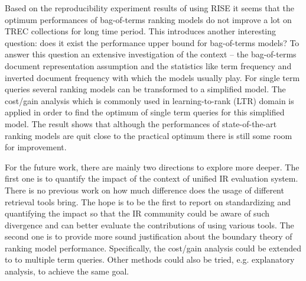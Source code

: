 Based on the reproducibility experiment results of using RISE it seems that 
the optimum performances of bag-of-terms ranking models do not improve a 
lot on TREC collections for long time period. 
This introduces another interesting question: does it exist the performance 
upper bound for bag-of-terms models? To answer this question an extensive 
investigation of the context -- the bag-of-terms document representation 
assumption and the statistics like term frequency and inverted document 
frequency with which the models usually play.
For single term queries several ranking models can be transformed to a 
simplified model. The cost/gain analysis which is commonly used in 
learning-to-rank (LTR) domain is applied in order to find the optimum 
of single term queries for this simplified model.
The result shows that although the performances of state-of-the-art 
ranking models are quit close to the practical optimum there is still some 
room for improvement.

For the future work, there are mainly two directions to explore more deeper. 
The first one is to quantify the impact of the context of unified 
IR evaluation system. There is no previous work on how much difference does 
the usage of different retrieval tools bring.
The hope is to be the first to report on standardizing and quantifying the 
impact so that the IR community could be aware of such divergence and can 
better evaluate the contributions of using various tools. 
The second one is to provide more sound justification about the boundary 
theory of ranking model performance. Specifically, the cost/gain 
analysis could be extended to to multiple term queries. 
Other methods could also be tried, e.g. explanatory analysis, to achieve 
the same goal.
